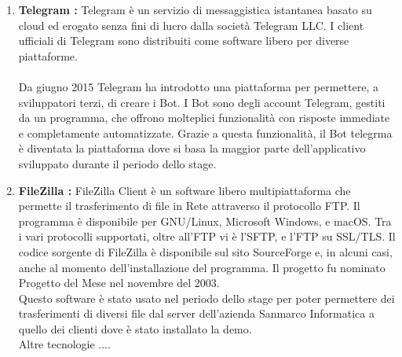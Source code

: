 \begin{enumerate}
\item \textbf{Telegram :} Telegram è un servizio di messaggistica istantanea basato su cloud ed erogato senza fini di lucro dalla società Telegram LLC. I client ufficiali di Telegram sono distribuiti come software libero per diverse piattaforme. \\\\
Da giugno 2015 Telegram ha introdotto una piattaforma per permettere, a sviluppatori terzi, di creare i Bot. I Bot sono degli account Telegram, gestiti da un programma, che offrono molteplici funzionalità con risposte immediate e completamente automatizzate. Grazie a questa funzionalità, il Bot telegrma è diventata la piattaforma dove si basa la maggior parte dell’applicativo sviluppato durante il periodo dello stage.

\item \textbf{FileZilla :} FileZilla Client è un software libero multipiattaforma che permette il trasferimento di file in Rete attraverso il protocollo FTP. Il programma è disponibile per GNU/Linux, Microsoft Windows, e macOS. Tra i vari protocolli supportati, oltre all'FTP vi è l'SFTP, e l'FTP su SSL/TLS. 
Il codice sorgente di FileZilla è disponibile sul sito SourceForge e, in alcuni casi, anche al momento dell'installazione del programma. Il progetto fu nominato Progetto del Mese nel novembre del 2003.\\
Questo software è stato usato nel periodo dello stage per poter permettere dei trasferimenti di diversi file dal server dell’azienda Sanmarco Informatica a quello dei clienti dove è stato installato la demo. \\

Altre tecnologie ....\\


\end{enumerate} 






















